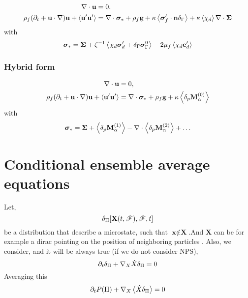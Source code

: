 \documentclass[12pt]{My_preprint}
\begin{document}
\begin{align}
    \mathbf{\nabla}\cdot \textbf{u} &= 0, \\
   \rho_f(\partial_t 
   + \textbf{u} \cdot \mathbf{\nabla}) \textbf{u}
   + \left<\textbf{u}'\textbf{u}'\right>
   &= 
   \mathbf{\nabla}\cdot \bm\sigma_*
   +\rho_f \textbf{g}
   +\kappa\left<\bm\sigma_f'\cdot \textbf{n}\delta_\Gamma\right>
   +\kappa\left<\chi_d \right>\mathbf{\nabla}\cdot \bm\Sigma
\end{align}
with 
\begin{equation}
   \bm\sigma_* = 
   \bm\Sigma
   + \zeta^{-1}\left<\chi_d \bm\sigma_d'
   + \delta_\Gamma \bm\sigma_\Gamma^0\right>
   -  2\mu_f\left<\chi_d  \textbf{e}_d'\right>
\end{equation}
\subsubsection{Hybrid form}
\begin{align}
    \mathbf{\nabla}\cdot \textbf{u} &= 0, \\
   \rho_f(\partial_t 
   + \textbf{u} \cdot \mathbf{\nabla}) \textbf{u}
   + \left<\textbf{u}'\textbf{u}'\right>
   &= 
   \mathbf{\nabla}\cdot \bm\sigma_*
   +\rho_f \textbf{g}
   +\kappa\left<\delta_{p} \textbf{M}_\alpha^{(0)}\right>
\end{align}
with 
\begin{equation}
    \bm\sigma_* = 
    \bm\Sigma
    + \left<\delta_{p} \textbf{M}_\alpha^{(1)}\right>
    - \mathbf{\nabla}\cdot \left<\delta_{p} \textbf{M}_\alpha^{(2)}\right>
    + \ldots
\end{equation}

\section{Conditional ensemble average equations}

Let, 
\begin{equation}
    \delta_\Pi[\textbf{X}(t,\mathscr{F}),\mathscr{F},t]
\end{equation}
be a distribution that describe a microstate, such that $\textbf{x} \notin \textbf{X}$.And  $\textbf{X}$ can be for example a dirac pointing on the position of neighboring particles . 
Also, we consider, and it will be always true (if we do not consider NPS), 
\begin{equation}
    \partial_t \delta_\Pi + \mathbf{\nabla}_X \dot{X}\delta_\Pi = 0
\end{equation}
Averaging this 
\begin{equation}
    \partial_t P(\Pi) + \mathbf{\nabla}_X \left<\dot{X}\delta_\Pi\right> = 0
\end{equation}
\end{document}
